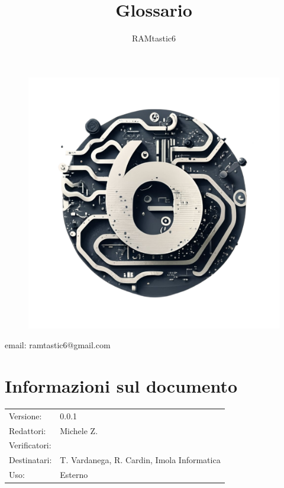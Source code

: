 \documentclass[12pt, oneside]{article}
\author{RAMtastic6}
\begin{document}
\thispagestyle{empty}
\title{Glossario}
\maketitle
\begin{figure}[h]
  \centering
  \includegraphics[scale=0.3]{logo.png}
\end{figure}
\begin{center}
    email: ramtastic6@gmail.com
\end{center}

\section*{Informazioni sul documento}
\begin{tabular}{ll}
Versione: & 0.0.1 \\
Redattori:  & Michele Z.\\
Verificatori: & \\ 
Destinatari: & T. Vardanega, R. Cardin, Imola Informatica \\
Uso: & Esterno
\end{tabular}
\newpage

\end{document}
